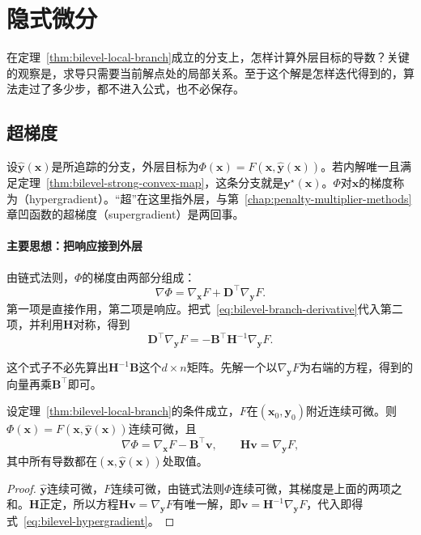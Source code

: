 \section{隐式微分}
\label{sec:bilevel-implicit}

在定理~\ref{thm:bilevel-local-branch}成立的分支上，怎样计算外层目标的导数？关键的观察是，求导只需要当前解点处的局部关系。至于这个解是怎样迭代得到的，算法走过了多少步，都不进入公式，也不必保存。

\subsection{超梯度}
\label{sec:bilevel-hypergradient}

设$\hat{\bm{y}}(\bm{x})$是所追踪的分支，外层目标为$\Phi(\bm{x})=F(\bm{x},\hat{\bm{y}}(\bm{x}))$。若内解唯一且满足定理~\ref{thm:bilevel-strong-convex-map}，这条分支就是$\bm{y}^\star(\bm{x})$。$\Phi$对$\bm{x}$的梯度称为（hypergradient）。“超”在这里指外层，与第~\ref{chap:penalty-multiplier-methods}章凹函数的超梯度（supergradient）是两回事。

\paragraph{主要思想：把响应接到外层}
由链式法则，$\Phi$的梯度由两部分组成：
\[
 \nabla\Phi=\nabla_{\bm{x}}F+\bm{D}^{\top}\nabla_{\bm{y}}F.
\]
第一项是直接作用，第二项是响应。把式~\eqref{eq:bilevel-branch-derivative}代入第二项，并利用$\bm{H}$对称，得到
\[
 \bm{D}^{\top}\nabla_{\bm{y}}F=-\bm{B}^{\top}\bm{H}^{-1}\nabla_{\bm{y}}F.
\]

这个式子不必先算出$\bm{H}^{-1}\bm{B}$这个$d\times n$矩阵。先解一个以$\nabla_{\bm{y}}F$为右端的方程，得到的向量再乘$\bm{B}^{\top}$即可。

\begin{theorem}[隐式超梯度]
\label{thm:bilevel-hypergradient}
设定理~\ref{thm:bilevel-local-branch}的条件成立，$F$在$(\bm{x}_0,\bm{y}_0)$附近连续可微。则$\Phi(\bm{x})=F(\bm{x},\hat{\bm{y}}(\bm{x}))$连续可微，且
\begin{equation}
 \nabla\Phi=\nabla_{\bm{x}}F-\bm{B}^{\top}\bm{v},
 \qquad\bm{H}\bm{v}=\nabla_{\bm{y}}F,
 \label{eq:bilevel-hypergradient}
\end{equation}
其中所有导数都在$(\bm{x},\hat{\bm{y}}(\bm{x}))$处取值。
\end{theorem}

\begin{proof}
$\hat{\bm{y}}$连续可微，$F$连续可微，由链式法则$\Phi$连续可微，其梯度是上面的两项之和。$\bm{H}$正定，所以方程$\bm{H}\bm{v}=\nabla_{\bm{y}}F$有唯一解，即$\bm{v}=\bm{H}^{-1}\nabla_{\bm{y}}F$，代入即得式~\eqref{eq:bilevel-hypergradient}。
\end{proof}

